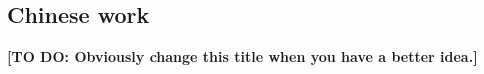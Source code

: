 \documentclass[a4paper,10pt]{llncs}
\newcommand\todo[1]{{\color{red}\textbf{[TO DO:  #1]}}}
\begin{document}
	\subsection{Chinese work}
	\todo{Obviously change this title when you have a better idea.}
%
%
%
\end{document}
